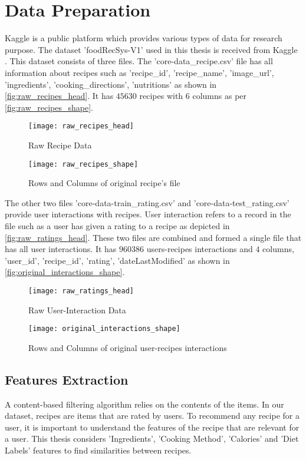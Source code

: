 
\section{Data Preparation}
Kaggle is a public platform which provides various types of data for research purpose. The dataset 'foodRecSys-V1' used in this thesis is received from Kaggle \cite{48}. This dataset consists of three files. The 'core-data\_recipe.csv' file has all information about recipes such as 'recipe\_id', 'recipe\_name', 'image\_url', 'ingredients', 'cooking\_directions', 'nutritions' as shown in \autoref{fig:raw_recipes_head}. It has $45630$ recipes with $6$ columns as per \autoref{fig:raw_recipes_shape}.

\begin{figure}[H]
	\centering
	\texttt{[image: raw\_recipes\_head]}
	\caption{Raw Recipe Data}
	\label{fig:raw_recipes_head}
\end{figure}

\begin{figure}[H]
	\centering
	\texttt{[image: raw\_recipes\_shape]}
	\caption{Rows and Columns of original recipe's file}
	\label{fig:raw_recipes_shape}
\end{figure}

\noindent The other two files 'core-data-train\_rating.csv' and 'core-data-test\_rating.csv' provide user interactions with recipes. User interaction refers to a record in the file such as a user has given a rating to a recipe as depicted in \autoref{fig:raw_ratings_head}. These two files are combined and formed a single file that has all user interactions.  It has $960386$ users-recipes interactions and $4$ columns, 'user\_id', 'recipe\_id', 'rating', 'dateLastModified' as shown in
 \autoref{fig:original_interactions_shape}.

\begin{figure}[H]
	\centering
	\texttt{[image: raw\_ratings\_head]}
	\caption{Raw User-Interaction Data}
	\label{fig:raw_ratings_head}
\end{figure}

\begin{figure}[H]
	\centering
	\texttt{[image: original\_interactions\_shape]}
	\caption{Rows and Columns of original user-recipes interactions }
	\label{fig:original_interactions_shape}
\end{figure}  


\subsection{Features Extraction}
A content-based filtering algorithm relies on the contents of the items. In our dataset, recipes are items that are rated by users. To recommend any recipe for a user, it is important to understand the features of the recipe that are relevant for a user. This thesis considers 'Ingredients', 'Cooking Method', 'Calories' and 'Diet Labels' features to find similarities between recipes.

